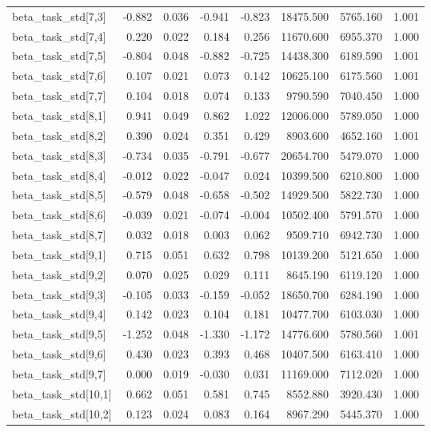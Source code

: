 \begin{tabular}{lrrrrrrr}
beta\_task\_std[7,3] & -0.882 & 0.036 & -0.941 & -0.823 & 18475.500 & 5765.160 & 1.001 \\
beta\_task\_std[7,4] & 0.220 & 0.022 & 0.184 & 0.256 & 11670.600 & 6955.370 & 1.000 \\
beta\_task\_std[7,5] & -0.804 & 0.048 & -0.882 & -0.725 & 14438.300 & 6189.590 & 1.001 \\
beta\_task\_std[7,6] & 0.107 & 0.021 & 0.073 & 0.142 & 10625.100 & 6175.560 & 1.001 \\
beta\_task\_std[7,7] & 0.104 & 0.018 & 0.074 & 0.133 & 9790.590 & 7040.450 & 1.000 \\
beta\_task\_std[8,1] & 0.941 & 0.049 & 0.862 & 1.022 & 12006.000 & 5789.050 & 1.000 \\
beta\_task\_std[8,2] & 0.390 & 0.024 & 0.351 & 0.429 & 8903.600 & 4652.160 & 1.001 \\
beta\_task\_std[8,3] & -0.734 & 0.035 & -0.791 & -0.677 & 20654.700 & 5479.070 & 1.000 \\
beta\_task\_std[8,4] & -0.012 & 0.022 & -0.047 & 0.024 & 10399.500 & 6210.800 & 1.000 \\
beta\_task\_std[8,5] & -0.579 & 0.048 & -0.658 & -0.502 & 14929.500 & 5822.730 & 1.000 \\
beta\_task\_std[8,6] & -0.039 & 0.021 & -0.074 & -0.004 & 10502.400 & 5791.570 & 1.000 \\
beta\_task\_std[8,7] & 0.032 & 0.018 & 0.003 & 0.062 & 9509.710 & 6942.730 & 1.000 \\
beta\_task\_std[9,1] & 0.715 & 0.051 & 0.632 & 0.798 & 10139.200 & 5121.650 & 1.000 \\
beta\_task\_std[9,2] & 0.070 & 0.025 & 0.029 & 0.111 & 8645.190 & 6119.120 & 1.000 \\
beta\_task\_std[9,3] & -0.105 & 0.033 & -0.159 & -0.052 & 18650.700 & 6284.190 & 1.000 \\
beta\_task\_std[9,4] & 0.142 & 0.023 & 0.104 & 0.181 & 10477.700 & 6103.030 & 1.000 \\
beta\_task\_std[9,5] & -1.252 & 0.048 & -1.330 & -1.172 & 14776.600 & 5780.560 & 1.001 \\
beta\_task\_std[9,6] & 0.430 & 0.023 & 0.393 & 0.468 & 10407.500 & 6163.410 & 1.000 \\
beta\_task\_std[9,7] & 0.000 & 0.019 & -0.030 & 0.031 & 11169.000 & 7112.020 & 1.000 \\
beta\_task\_std[10,1] & 0.662 & 0.051 & 0.581 & 0.745 & 8552.880 & 3920.430 & 1.000 \\
beta\_task\_std[10,2] & 0.123 & 0.024 & 0.083 & 0.164 & 8967.290 & 5445.370 & 1.000 \\

\end{tabular}
